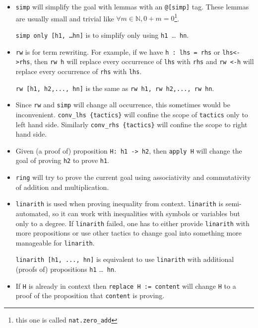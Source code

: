 \documentclass{report}
\theoremstyle{definition}
\theoremstyle{plain}
\begin{document}
\begin{itemize}
\begin{itemize}
    \item {\tt simp} will simplify the goal with lemmas with an {\tt @[simp]} tag. These lemmas are usually small and trivial like $\forall m\in\mathbb N, 0+m=0$\footnote{this one is called {\tt nat.zero\_add}}.
    
    {\tt simp only [h1, \dots hn]} is to simplify only using {\tt h1 }\dots{\tt{ hn}}.

    \item {\tt rw} is for term rewriting. For example, if we have {\tt h : lhs = rhs} or {\tt lhs<->rhs}, then {\tt rw h} will replace every occurrence of {\tt lhs} with {\tt rhs} and {\tt rw <-h} will replace every occurrence of {\tt rhs} with {\tt lhs}. 
    
    {\tt rw [h1, h2,..., hn]} is the same as {\tt rw h1, rw h2,..., rw hn}.
    \item Since {\tt rw} and {\tt simp} will change all occurrence, this sometimes would be inconvenient. {\tt conv\_lhs \{tactics\}} will confine the scope of {\tt tactics} only to left hand side. Similarly {\tt conv\_rhs \{tactics\}} will confine the scope to right hand side.
    \item Given (a proof of) proposition {\tt H: h1 -> h2}, then {\tt apply H} will change the goal of proving {\tt h2} to prove {\tt h1}.
    \item {\tt ring} will try to prove the current goal using associativity and commutativity of addition and multiplication.
    \item {\tt linarith} is used when proving inequality from context. {\tt linarith} is semi-automated, so it can work with inequalities with symbols or variables but only to a degree. If {\tt linarith} failed, one has to either provide {\tt linarith} with more propositions or use other tactics to change goal into something more manageable for {\tt linarith}.
    
    {\tt linarith [h1, ..., hn]} is equivalent to use {\tt linarith} with additional (proofs of) propositions {\tt h1} \dots {\tt { hn}}.
    \item If {\tt H} is already in context then {\tt replace H := content} will change {\tt H} to a proof of the proposition that {\tt content} is proving.
    

\end{itemize}
\end{itemize}
\end{document}
